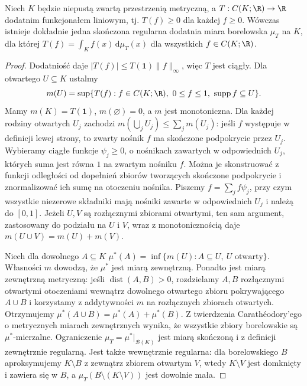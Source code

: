 \begin{lemat}
\label{lem:riesz-positive12}
Niech $K$ będzie niepustą zwartą przestrzenią metryczną,
a $T:C(K;\R)\to\R$ dodatnim funkcjonałem liniowym,
tj. $T(f)\ge0$ dla każdej $f\ge0$.
Wówczas istnieje dokładnie jedna skończona regularna dodatnia miara
borelowska $\mu_T$ na $K$, dla której
$T(f)=\int_Kf(x)\,\mathrm d\mu_T(x)$ dla wszystkich $f\in C(K;\R)$.
\end{lemat}
\begin{proof}
Dodatniość daje $|T(f)|\le T(\mathbf1)\|f\|_\infty$,
więc $T$ jest ciągły. Dla otwartego $U\subseteq K$ ustalmy
\[
 m(U)=\sup\{T(f):f\in C(K;\R),\ 0\le f\le1,
 \ \operatorname{supp}f\subseteq U\}.
\]
Mamy $m(K)=T(\mathbf1)$, $m(\varnothing)=0$, a $m$
jest monotoniczna. Dla każdej rodziny otwartych
$U_j$ zachodzi $m(\bigcup_jU_j)\le\sum_jm(U_j)$:
jeśli $f$ występuje w definicji lewej strony,
to zwarty nośnik $f$ ma skończone podpokrycie przez $U_j$.
Wybieramy ciągłe funkcje $\psi_j\ge0$, o nośnikach zawartych
w odpowiednich $U_j$, których suma jest równa $1$
na zwartym nośniku $f$. Można je skonstruować z funkcji
odległości od dopełnień zbiorów tworzących skończone
podpokrycie i znormalizować ich sumę na otoczeniu nośnika. Piszemy
$f=\sum_jf\psi_j$, przy czym wszystkie niezerowe składniki
mają nośniki zawarte w odpowiednich $U_j$ i należą do $[0,1]$.
Jeżeli $U,V$ są rozłącznymi zbiorami otwartymi, ten sam
argument, zastosowany do podziału na $U$ i $V$, wraz z
monotonicznością daje $m(U\cup V)=m(U)+m(V)$.

Niech dla dowolnego $A\subseteq K$
$\mu^*(A)=\inf\{m(U):A\subseteq U,\ U\text{ otwarty}\}$.
Własności $m$ dowodzą, że $\mu^*$ jest miarą zewnętrzną.
Ponadto jest miarą zewnętrzną metryczną: jeśli
$\operatorname{dist}(A,B)>0$, rozdzielamy $A,B$ rozłącznymi
otwartymi otoczeniami wewnątrz dowolnego otwartego
zbioru pokrywającego $A\cup B$ i korzystamy z addytywności
$m$ na rozłącznych zbiorach otwartych. Otrzymujemy
$\mu^*(A\cup B)=\mu^*(A)+\mu^*(B)$.
Z twierdzenia Carath\'eodory'ego o metrycznych miarach
zewnętrznych wynika, że wszystkie zbiory borelowskie są
$\mu^*$-mierzalne. Ograniczenie $\mu_T=\mu^*|_{\mathcal B(K)}$
jest miarą skończoną i z definicji zewnętrznie regularną.
Jest także wewnętrznie regularna: dla borelowskiego $B$
aproksymujemy $K\setminus B$ z zewnątrz zbiorem otwartym
$V$, wtedy $K\setminus V$ jest domknięty i zawiera się w $B$,
a $\mu_T(B\setminus(K\setminus V))$ jest dowolnie mała.


\end{proof}
